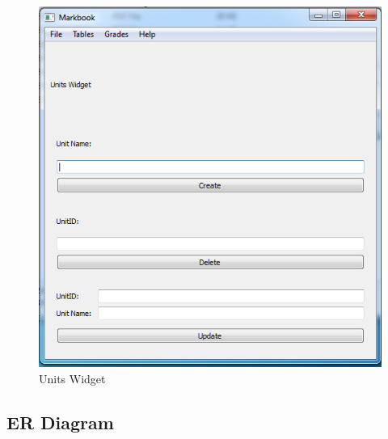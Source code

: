 \begin{figure}[H]
    \includegraphics[width=\textwidth]{./Images/units.png}
    \caption{Units Widget} \label{}
\end{figure}
\subsection{ER Diagram}

